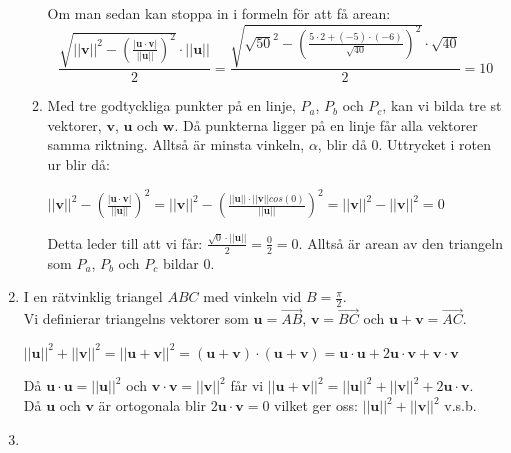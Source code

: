 \documentclass[a4paper]{report}
\begin{document}
\begin{enumerate}
\begin{enumerate}
                Om man sedan kan stoppa in i formeln för att få arean:
                \begin{equation}
                    \frac{\sqrt{||\bm{v}||^{2}-(\frac{|\bm{u}\cdot \bm{v}|}{||\bm{u}||})^{2}}\cdot ||\bm{u}||}{2}=
                    \frac{\sqrt{\sqrt{50}^{2}-(\frac{5\cdot 2 + (-5)\cdot (-6)}{\sqrt{40}})^{2}}\cdot \sqrt{40}}{2}=
                    10
                \end{equation}
            \item 
                Med tre godtyckliga punkter på en linje, $P_{a}$, $P_{b}$ och $P_{c}$, kan vi bilda tre st vektorer, $\bm{v}$, $\bm{u}$ och $\bm{w}$.
                Då punkterna ligger på en linje får alla vektorer samma riktning.
                Alltså är minsta vinkeln, $\alpha$, blir då 0.
                Uttrycket i roten ur blir då: 
                \begin{center}
                    $
                    ||\bm{v}||^{2}-(\frac{|\bm{u}\cdot \bm{v}|}{||\bm{u}||})^{2} = 
                    ||\bm{v}||^{2}-(\frac{||\bm{u}||\cdot||\bm{v}||cos(0)}{||\bm{u}||})^{2}=
                    ||\bm{v}||^{2}-||\bm{v}||^{2}=0
                    $
                \end{center}
                Detta leder till att vi får: $\frac{\sqrt{0}\cdot ||\bm{u}||}{2}=\frac{0}{2}=0$.
                Alltså är arean av den triangeln som $P_{a}$, $P_{b}$ och $P_{c}$ bildar 0.
        \end{enumerate}
    \item
        I en rätvinklig triangel $ABC$ med vinkeln vid $B=\frac{\pi}{2}$.\\
        Vi definierar triangelns vektorer som $\bm{u} = \overrightarrow{AB}$, $\bm{v} = \overrightarrow{BC}$ och $\bm{u}+\bm{v} = \overrightarrow{AC}$.
        \begin{center}
            $||\bm{u}||^{2}+||\bm{v}||^{2}=||\bm{u}+\bm{v}||^{2}=(\bm{u}+\bm{v})\cdot (\bm{u}+\bm{v}) = \bm{u}\cdot \bm{u} + 2\bm{u}\cdot \bm{v}+\bm{v}\cdot \bm{v}$\\
        \end{center}
        Då $\bm{u}\cdot \bm{u}=||\bm{u}||^{2}$ och $\bm{v}\cdot \bm{v}=||\bm{v}||^{2}$ får vi $||\bm{u}+\bm{v}||^{2}=||\bm{u}||^{2}+||\bm{v}||^{2}+2\bm{u}\cdot \bm{v}$.\\
        Då $\bm{u}$ och $\bm{v}$ är ortogonala blir $2\bm{u}\cdot \bm{v} = 0$ vilket ger oss: $||\bm{u}||^{2}+||\bm{v}||^{2}$ v.s.b.
    \item 
        \begin{enumerate}

\end{enumerate}
\end{enumerate}
\end{document}
